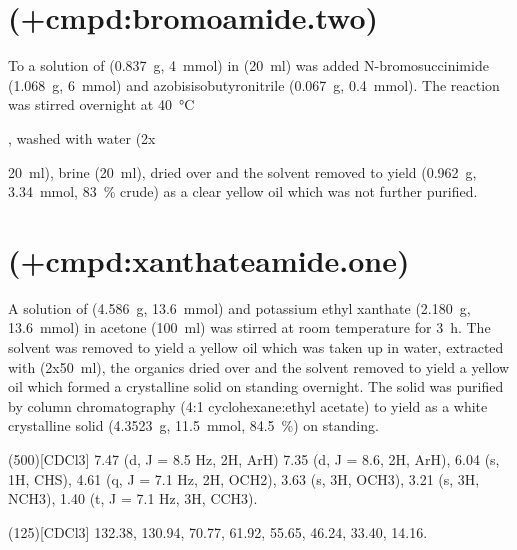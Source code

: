 {\section{ (\cmpd+{cmpd:bromoamide.two})}

To a solution of  (\SI{0.837}{\gram}, \SI{4}{\milli\mol}) in  (\SI{20}{\milli\litre}) was added N-bromosuccinimide (\SI{1.068}{\gram}, \SI{6}{\milli\mol}) and azobisisobutyronitrile (\SI{0.067}{\gram}, \SI{0.4}{\milli\mol}). The reaction was stirred overnight at \SI{40}{\celsius}}, washed with water (2x{\SI{20}{\milli\litre}), brine (\SI{20}{\milli\litre}), dried over  and the solvent removed \invacuo to yield  (\SI{0.962}{\gram}, \SI{3.34}{\milli\mol}, \SI{83}{\percent} crude) as a clear yellow oil which was not further purified.


\section{ (\cmpd+{cmpd:xanthateamide.one})}

A solution of  (\SI{4.586}{\gram}, \SI{13.6}{\milli\mol}) and potassium ethyl xanthate (\SI{2.180}{\gram}, \SI{13.6}{\milli\mol}) in acetone ({\SI{100}{\milli\litre}}) was stirred at room temperature for \SI{3}{\hour}. The solvent was removed \invacuo to yield a yellow oil which was taken up in water, extracted with  (2x\SI{50}{\milli\litre}), the organics dried over  and the solvent removed \invacuo to yield a yellow oil which formed a crystalline solid on standing overnight. The solid was purified by column chromatography (4:1 cyclohexane:ethyl acetate) to yield  as a white crystalline solid (\SI{4.3523}{\gram}, \SI{11.5}{\milli\mol}, \SI{84.5}{\percent}) on standing.

\NMR(500)[CDCl3] 7.47 (d, J = 8.5 Hz, 2H, ArH) 7.35 (d, J = 8.6, 2H, ArH), 6.04 (s, 1H, CHS), 4.61 (q, J = 7.1 Hz, 2H, OCH2), 3.63 (s, 3H, OCH3), 3.21 (s, 3H, NCH3), 1.40 (t, J = 7.1 Hz, 3H, CCH3).

(125)[CDCl3] 132.38, 130.94, 70.77, 61.92, 55.65, 46.24, 33.40, 14.16.


}
